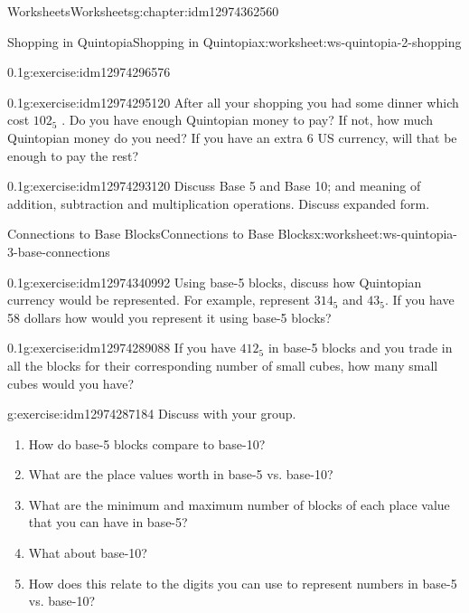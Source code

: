 \documentclass[twoside,11pt,]{book}
\begin{document}
\begin{chapterptx}{Worksheets}{}{Worksheets}{}{}{g:chapter:idm12974362560}
\begin{worksheet-section-numberless}{Shopping in Quintopia}{}{Shopping in Quintopia}{}{}{x:worksheet:ws-quintopia-2-shopping}
\begin{divisionexercise}{4}{}{0.1}{g:exercise:idm12974296576}
\end{divisionexercise}%
\begin{divisionexercise}{5}{}{0.1}{g:exercise:idm12974295120}%
After all your shopping you had some dinner which cost \(102_{5}\) . Do you have enough Quintopian money to pay? If not, how much Quintopian money do you need?  If you have an extra \textdollar{}6 US currency, will that be enough to pay the rest?%
\end{divisionexercise}%
\begin{divisionexercise}{6}{}{0.1}{g:exercise:idm12974293120}%
Discuss Base 5 and Base 10; and meaning of addition, subtraction and multiplication operations. Discuss expanded form.%
\end{divisionexercise}%
\end{worksheet-section-numberless}
\restoregeometry
%
%
\typeout{************************************************}
\typeout{************************************************}
%
\begin{worksheet-section-numberless}{Connections to Base Blocks}{}{Connections to Base Blocks}{}{}{x:worksheet:ws-quintopia-3-base-connections}
\begin{divisionexercise}{1}{}{0.1}{g:exercise:idm12974340992}%
Using base-5 blocks, discuss how Quintopian currency would be represented. For example, represent \(314_{5}\) and \(43_{5}\). If you have \textdollar{}58 dollars how would you represent it using base-5 blocks?%
\end{divisionexercise}%
\begin{divisionexercise}{2}{}{0.1}{g:exercise:idm12974289088}%
If you have \(412_{5}\) in base-5 blocks and you trade in all the blocks for their corresponding number of small cubes, how many small cubes would you have?%
\end{divisionexercise}%
\begin{divisionexercise}{3}{}{}{g:exercise:idm12974287184}%
Discuss with your group.%
%
\begin{enumerate}[label=(\alph*)]
\item{}How do base-5 blocks compare to base-10?%
\item{}What are the place values worth in base-5 vs. base-10?%
\item{}What are the minimum and maximum number of blocks of each place value that you can have in base-5?%
\item{}What about base-10?%
\item{}How does this relate to the digits you can use to represent numbers in base-5 vs. base-10?%

\end{enumerate}
\end{divisionexercise}
\end{worksheet-section-numberless}
\end{chapterptx}
\end{document}
